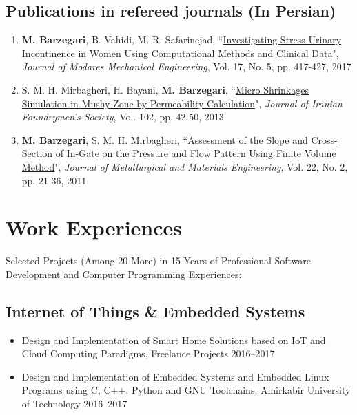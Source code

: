 \documentclass{cv}
\begin{document}
\subsection{Publications in refereed journals (In Persian)}
\begin{enumerate}
\item
\textbf{M. Barzegari}, B. Vahidi, M. R. Safarinejad, ``\href{http://mme-old.modares.ac.ir/article_16771_en.html}{Investigating Stress Urinary Incontinence in Women Using Computational Methods and Clinical Data}", \textit{Journal of Modares Mechanical Engineering}, Vol. 17, No. 5, pp. 417-427, 2017 %
\item
S. M. H. Mirbagheri, H. Bayani, \textbf{M. Barzegari}, ``\href{https://1drv.ms/b/s!Av7P45pSaDtYgUnsN3LHLbiNHomt}{Micro Shrinkages Simulation in Mushy Zone by Permeability Calculation}", \textit{Journal of Iranian Foundrymen's Society}, Vol. 102, pp. 42-50, 2013 %
\item
\textbf{M. Barzegari}, S. M. H. Mirbagheri, ``\href{http://jmme.um.ac.ir/index.php/metallurgical/article/view/10905}{Assessment of the Slope and Cross-Section of In-Gate on the Pressure and Flow Pattern Using Finite Volume Method}", \textit{Journal of Metallurgical and Materials Engineering}, Vol. 22, No. 2, pp. 21-36, 2011 %
\end{enumerate}



\section{Work Experiences}


Selected Projects (Among 20 More) in 15 Years of Professional Software Development and Computer Programming Experiences:

\subsection{Internet of Things \& Embedded Systems}

\begin{itemize}

\item
Design and Implementation of Smart Home Solutions based on IoT and Cloud Computing Paradigms, Freelance Projects \hfill 2016--2017
\item
Design and Implementation of Embedded Systems and Embedded Linux Programs using C, C++, Python and GNU Toolchains, Amirkabir University of Technology \hfill 2016--2017

\end{itemize}
\end{document}
